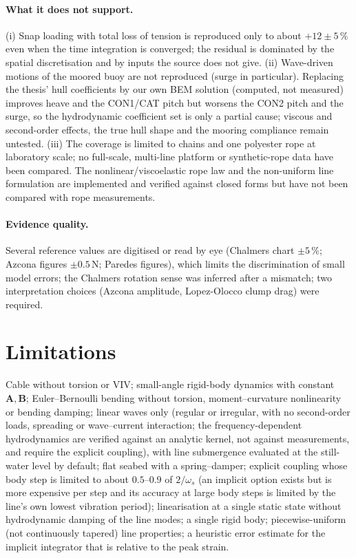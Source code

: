 \documentclass[11pt,a4paper]{article}
\begin{document}
\paragraph{What it does not support.} (i) Snap loading with total loss of tension is reproduced only to about $+12\pm5\,\%$ even when the time integration is converged; the residual is dominated by the spatial discretisation and by inputs the source does not give. (ii) Wave-driven motions of the moored buoy are not reproduced (surge in particular). Replacing the thesis' hull coefficients by our own BEM solution (computed, not measured) improves heave and the CON1/CAT pitch but worsens the CON2 pitch and the surge, so the hydrodynamic coefficient set is only a partial cause; viscous and second-order effects, the true hull shape and the mooring compliance remain untested. (iii) The coverage is limited to chains and one polyester rope at laboratory scale; no full-scale, multi-line platform or synthetic-rope data have been compared. The nonlinear/viscoelastic rope law and the non-uniform line formulation are implemented and verified against closed forms but have not been compared with rope measurements.

\paragraph{Evidence quality.} Several reference values are digitised or read by eye (Chalmers chart $\pm5\,\%$; Azcona figures $\pm0.5$\,N; Paredes figures), which limits the discrimination of small model errors; the Chalmers rotation sense was inferred after a mismatch; two interpretation choices (Azcona amplitude, Lopez-Olocco clump drag) were required.

\section{Limitations}
Cable without torsion or VIV; small-angle rigid-body dynamics with constant $\mathbf A,\mathbf B$; Euler--Bernoulli bending without torsion, moment--curvature nonlinearity or bending damping; linear waves only (regular or irregular, with no second-order loads, spreading or wave--current interaction; the frequency-dependent hydrodynamics are verified against an analytic kernel, not against measurements, and require the explicit coupling), with line submergence evaluated at the still-water level by default; flat seabed with a spring--damper; explicit coupling whose body step is limited to about $0.5$--$0.9$ of $2/\omega_s$ (an implicit option exists but is more expensive per step and its accuracy at large body steps is limited by the line's own lowest vibration period); linearisation at a single static state without hydrodynamic damping of the line modes; a single rigid body; piecewise-uniform (not continuously tapered) line properties; a heuristic error estimate for the implicit integrator that is relative to the peak strain.
\end{document}
